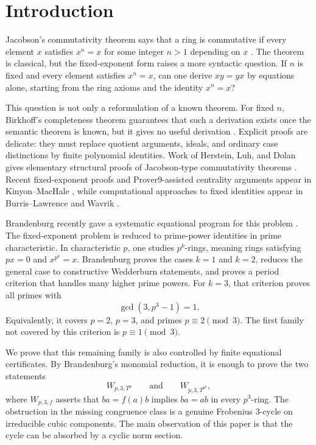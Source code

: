 \section{Introduction}\label{sec:introduction}

Jacobson's commutativity theorem says that a ring is commutative if every element \(x\) satisfies \(x^n=x\) for some integer \(n>1\) depending on \(x\) \cite{jacobson1945}.  The theorem is classical, but the fixed-exponent form raises a more syntactic question.  If \(n\) is fixed and every element satisfies \(x^n=x\), can one derive \(xy=yx\) by equations alone, starting from the ring axioms and the identity \(x^n=x\)?

This question is not only a reformulation of a known theorem.  For fixed \(n\), Birkhoff's completeness theorem guarantees that such a derivation exists once the semantic theorem is known, but it gives no useful derivation \cite{birkhoff1935}.  Explicit proofs are delicate: they must replace quotient arguments, ideals, and ordinary case distinctions by finite polynomial identities.  Work of Herstein, Luh, and Dolan gives elementary structural proofs of Jacobson-type commutativity theorems \cite{herstein1961,luh1967,dolan1976}.  Recent fixed-exponent proofs and Prover9-assisted centrality arguments appear in Kinyon--MacHale \cite{kinyonMacHale2026}, while computational approaches to fixed identities appear in Burris--Lawrence and Wavrik \cite{burrisLawrence1991,wavrik1999}.

Brandenburg recently gave a systematic equational program for this problem \cite{brandenburg2023}.  The fixed-exponent problem is reduced to prime-power identities in prime characteristic.  In characteristic \(p\), one studies \(p^k\)-rings, meaning rings satisfying \(px=0\) and \(x^{p^k}=x\).  Brandenburg proves the cases \(k=1\) and \(k=2\), reduces the general case to constructive Wedderburn statements, and proves a period criterion that handles many higher prime powers.  For \(k=3\), that criterion proves all primes with
\[
  \gcd(3,p^3-1)=1.
\]
Equivalently, it covers \(p=2\), \(p=3\), and primes \(p\equiv 2 \pmod 3\).  The first family not covered by this criterion is \(p\equiv 1 \pmod 3\).

We prove that this remaining family is also controlled by finite equational certificates.  By Brandenburg's monomial reduction, it is enough to prove the two statements
\[
  W_{p,3,T^p}
  \qquad\text{and}\qquad
  W_{p,3,T^{p^2}},
\]
where \(W_{p,3,f}\) asserts that \(ba=f(a)b\) implies \(ba=ab\) in every \(p^3\)-ring.  The obstruction in the missing congruence class is a genuine Frobenius 3-cycle on irreducible cubic components.  The main observation of this paper is that the cycle can be absorbed by a cyclic norm section.

